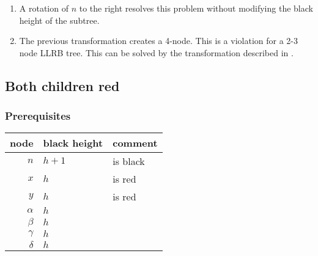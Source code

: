 \documentclass[a4paper,10pt,twoside]{article}
\begin{document}
\begin{enumerate}
\item A rotation of $n$ to the right resolves this problem without modifying the
black height of the subtree.

\begin{center}
\end{center}


\item The previous transformation creates a 4-node. This is a violation for a
2-3 node LLRB tree. This can be solved by the transformation described in
.

\end{enumerate}


\newpage
\subsection{Both children red}
\label{insert_both_children_red}

\subsubsection{Prerequisites}

\begin{center}
\begin{tabular}{|r||l|l|}
\hline
node		&	black height	&	comment	\\
\hline
\hline
$n$		&	$h+1$	&	is black	\\\hline
$x$		&	$h$	&	is red	\\\hline
$y$		&	$h$	&	is red	\\\hline
$\alpha$	&	$h$	&		\\\hline
$\beta$		&	$h$	&		\\\hline
$\gamma$	&	$h$	&		\\\hline
$\delta$	&	$h$	&		\\\hline
\end{tabular}
\end{center}
\end{document}
